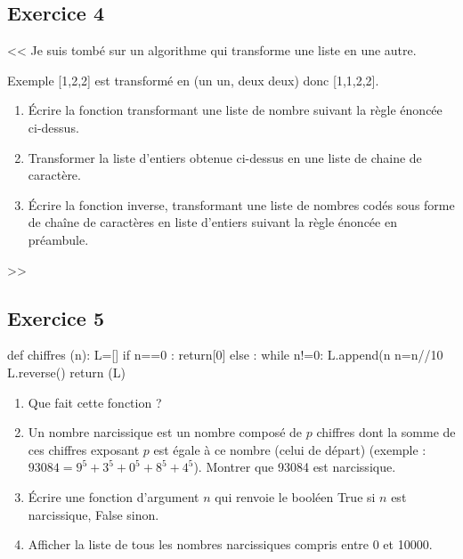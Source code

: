 \documentclass[10pt,fleqn]{article} %
\begin{document}
\begin{multicols}{2}
\subsection*{Exercice 4}
<< Je suis tombé sur un algorithme qui transforme une liste en une autre. 

Exemple [1,2,2] est transformé en (un un, deux deux) donc [1,1,2,2].

\begin{enumerate}
\item Écrire la fonction transformant une liste de nombre suivant la règle énoncée ci-dessus.
\item Transformer la liste d'entiers obtenue ci-dessus en une liste de chaine de caractère.
\item Écrire la fonction inverse, transformant une liste de nombres codés sous forme de chaîne de caractères en liste d'entiers suivant la règle énoncée en préambule.
\end{enumerate}
>>



\subsection*{Exercice 5}
\begin{py}
\begin{python}
def chiffres (n):
    L=[]
    if n==0 : 
        return[0]
    else : 
        while n!=0:
            L.append(n%
            n=n//10
    L.reverse()
    return (L)        
\end{python}
\end{py}


\begin{enumerate}
\item Que fait cette fonction ?
\item Un nombre narcissique est un nombre composé de $p$ chiffres dont la somme de ces chiffres exposant $p$ est égale à ce nombre (celui de départ) (exemple : $93084 = 9^5 + 3^5 + 0^5 + 8 ^5 + 4^5$). Montrer que 93084 est narcissique.
\item Écrire une fonction d'argument $n$ qui renvoie le booléen True si $n$ est narcissique, False sinon.
\item Afficher la liste de tous les nombres narcissiques compris entre 0 et 10000.
\end{enumerate}


\end{multicols}
\end{document}
